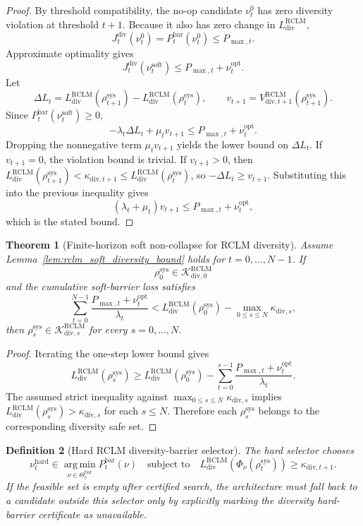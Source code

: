 \documentclass[11pt,a4paper]{article}
\newtheorem{theorem}{Theorem}[section]
\newtheorem{definition}[theorem]{Definition}
\newcommand{\Kcal}{\mathcal K}
\newcommand{\argmin}{\operatorname*{arg\,min}}
\newcommand{\RCLM}{\mathrm{RCLM}}
\newcommand{\sys}{\mathrm{sys}}
\newcommand{\soft}{\mathrm{soft}}
\newcommand{\hard}{\mathrm{hard}}
\begin{document}
\begin{proof}
By threshold compatibility, the no-op candidate \(\nu_t^0\) has zero diversity violation at threshold \(t+1\).  Because it also has zero change in \(L_{\mathrm{div}}^{\RCLM}\),
\[
J_t^{\mathrm{div}}(\nu_t^0)=P_t^{\mathrm{bar}}(\nu_t^0)\le P_{\max,t}.
\]
Approximate optimality gives
\[
J_t^{\mathrm{div}}(\nu_t^{\soft})\le P_{\max,t}+\nu_t^{\mathrm{opt}}.
\]
Let
\[
\Delta L_t=L_{\mathrm{div}}^{\RCLM}(\rho_{t+1}^{\sys})-L_{\mathrm{div}}^{\RCLM}(\rho_t^{\sys}),
\qquad
v_{t+1}=V_{\mathrm{div},t+1}^{\RCLM}(\rho_{t+1}^{\sys}).
\]
Since \(P_t^{\mathrm{bar}}(\nu_t^{\soft})\ge0\),
\[
-\lambda_t\Delta L_t+\mu_t v_{t+1}\le P_{\max,t}+\nu_t^{\mathrm{opt}}.
\]
Dropping the nonnegative term \(\mu_t v_{t+1}\) yields the lower bound on \(\Delta L_t\).  If \(v_{t+1}=0\), the violation bound is trivial.  If \(v_{t+1}>0\), then \(L_{\mathrm{div}}^{\RCLM}(\rho_{t+1}^{\sys})<\kappa_{\mathrm{div},t+1}\le L_{\mathrm{div}}^{\RCLM}(\rho_t^{\sys})\), so \(-\Delta L_t\ge v_{t+1}\).  Substituting this into the previous inequality gives
\[
(\lambda_t+\mu_t)v_{t+1}\le P_{\max,t}+\nu_t^{\mathrm{opt}},
\]
which is the stated bound.
\end{proof}

\begin{theorem}[Finite-horizon soft non-collapse for RCLM diversity]
\label{thm:rclm_finite_horizon_soft_diversity}
Assume Lemma~\ref{lem:rclm_soft_diversity_bound} holds for \(t=0,\ldots,N-1\).  If
\[
\rho_0^{\sys}\in\Kcal_{\mathrm{div},0}^{\RCLM}
\]
and the cumulative soft-barrier loss satisfies
\[
\sum_{t=0}^{N-1}\frac{P_{\max,t}+\nu_t^{\mathrm{opt}}}{\lambda_t}
<
L_{\mathrm{div}}^{\RCLM}(\rho_0^{\sys})-\max_{0\le s\le N}\kappa_{\mathrm{div},s},
\]
then \(\rho_s^{\sys}\in\Kcal_{\mathrm{div},s}^{\RCLM}\) for every \(s=0,\ldots,N\).
\end{theorem}

\begin{proof}
Iterating the one-step lower bound gives
\[
L_{\mathrm{div}}^{\RCLM}(\rho_s^{\sys})
\ge
L_{\mathrm{div}}^{\RCLM}(\rho_0^{\sys})
-
\sum_{t=0}^{s-1}\frac{P_{\max,t}+\nu_t^{\mathrm{opt}}}{\lambda_t}.
\]
The assumed strict inequality against \(\max_{0\le s\le N}\kappa_{\mathrm{div},s}\) implies \(L_{\mathrm{div}}^{\RCLM}(\rho_s^{\sys})>\kappa_{\mathrm{div},s}\) for each \(s\le N\).  Therefore each \(\rho_s^{\sys}\) belongs to the corresponding diversity safe set.
\end{proof}

\begin{definition}[Hard RCLM diversity-barrier selector]
The hard selector chooses
\[
\nu_t^{\hard}
\in
\argmin_{\nu\in\Theta_t^{\mathrm{bar}}}P_t^{\mathrm{bar}}(\nu)
\quad\text{subject to}\quad
L_{\mathrm{div}}^{\RCLM}(\Phi_\nu(\rho_t^{\sys}))\ge\kappa_{\mathrm{div},t+1}.
\]
If the feasible set is empty after certified search, the architecture must fall back to a candidate outside this selector only by explicitly marking the diversity hard-barrier certificate as unavailable.
\end{definition}
\end{document}
